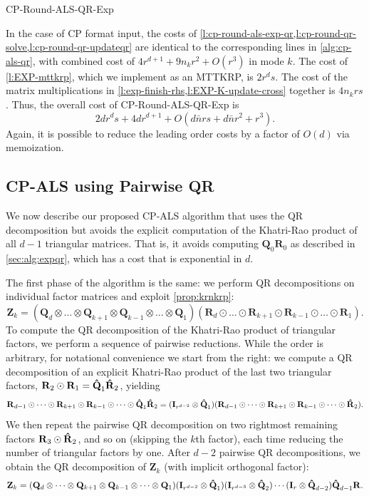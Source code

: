 \documentclass{article}
\newcommand{\mat}[1]{\mathbf{#1}}
\newcommand{\M}[2][]{\bm{#1{\mathbf{\MakeUppercase{#2}}}}} 		%
\newcommand{\kron}{\otimes}
\begin{document}
\begin{algorithm}[!ht]
  \caption{CP-Round-ALS-QR-Exp}
  \label{alg:cp-als-qr-k}
  
\end{algorithm}

In the case of CP format input, the costs of \cref{l:cp-round-als-exp-qr,l:cp-round-qr-solve,l:cp-round-qr-updateqr} are identical to the corresponding lines in \cref{alg:cp-als-qr}, with combined cost of $4r^{d+1}+9n_kr^2+O(r^3)$ in mode $k$.
The cost of \cref{l:EXP-mttkrp}, which we implement as an MTTKRP, is $2r^ds$.
The cost of the matrix multiplications in \cref{l:exp-finish-rhs,l:EXP-K-update-cross} together is $4n_krs$.
Thus, the overall cost of CP-Round-ALS-QR-Exp is
$$ 2dr^ds + 4dr^{d+1} + O(d\bar{n}rs+d\bar{n}r^2 + r^3).$$
Again, it is possible to reduce the leading order costs by a factor of $O(d)$ via memoization.

\subsection{CP-ALS using Pairwise QR}
\label{sec:alg:pwqr}


We now describe our proposed CP-ALS algorithm that uses the QR decomposition but avoids the explicit computation of the Khatri-Rao product of all $d-1$ triangular matrices.
That is, it avoids computing $\mat{Q}_0\mat{R}_0$ as described in \cref{sec:alg:expqr}, which has a cost that is exponential in $d$.

The first phase of the algorithm is the same: we perform QR decompositions on individual factor matrices and exploit \cref{prop:krnkrp}:
$$\mat{Z}_k = (\mat{Q}_d \otimes \dots \otimes \mat{Q}_{k+1} \otimes \mat{Q}_{k-1} \otimes \dots \otimes \mat{Q}_1)(\mat{R}_d \odot \dots \odot \mat{R}_{k+1} \odot \mat{R}_{k-1} \odot \dots \odot \mat{R}_1).$$
To compute the QR decomposition of the Khatri-Rao product of triangular factors, we perform a sequence of pairwise reductions.
While the order is arbitrary, for notational convenience we start from the right: we compute a QR decomposition of an explicit Khatri-Rao product of the last two triangular factors, $\mat{R}_2 \odot \mat{R}_1 = \M[\hat]{Q}_1\M[\hat]{R}_2$, yielding
$$\M{R}_{d-1} \odot \dots \odot \mat{R}_{k+1} \odot \mat{R}_{k-1} \odot \dots \odot \M[\hat]{Q}_1\M[\hat]{R}_2 = (\M{I}_{r^{d-2}} \kron \M[\hat]{Q}_1)(\M{R}_{d-1} \odot \cdots \odot \mat{R}_{k+1} \odot \mat{R}_{k-1} \odot \dots \odot \M[\hat]{R}_2).$$
We then repeat the pairwise QR decomposition on two rightmost remaining factors $\M{R}_{3} \odot \M[\hat]{R}_2$, and so on (skipping the $k$th factor), each time reducing the number of triangular factors by one.
After $d-2$ pairwise QR decompositions, we obtain the QR decomposition of $\mat{Z}_k$ (with implicit orthogonal factor):
$$\mat{Z}_k = (\mat{Q}_d \otimes \dots \otimes \mat{Q}_{k+1} \otimes \mat{Q}_{k-1} \otimes \dots \otimes \mat{Q}_1) (\M{I}_{r^{d-2}} \kron \M[\hat]{Q}_1)(\M{I}_{r^{d-3}} \kron \M[\hat]{Q}_2) \cdots (\mat{I}_r \otimes \M[\hat]{Q}_{d-2}) \M[\hat]{Q}_{d-1}\M{R}.$$
\end{document}

